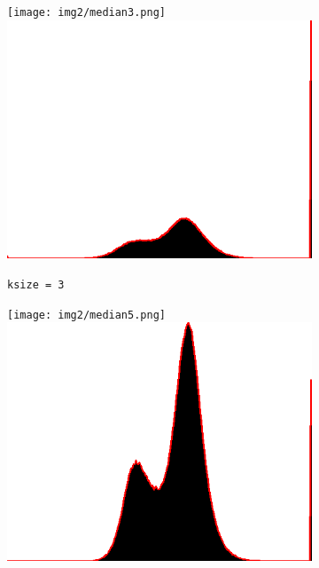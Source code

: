\begin{figure}[H]
    \centering
    \begin{subfigure}[b]{0.24\textwidth}
        \texttt{[image: img2/median3.png]}\\[0.1cm]
        \includegraphics[width=\textwidth]{img2/kernel3.png}
        \caption{\lstinline|ksize = 3|}
        \label{fig:img2_kernel3}
    \end{subfigure}
    \begin{subfigure}[b]{0.24\textwidth}
        \texttt{[image: img2/median5.png]}\\[0.1cm]
        \includegraphics[width=\textwidth]{img2/kernel5.png}

\end{subfigure}
\end{figure}

